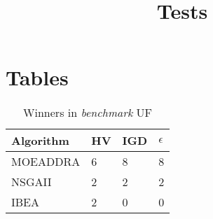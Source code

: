 \documentclass{article}
\title{Tests}
\begin{document}
\maketitle

\section{Tables}

\begin{table}[!h]
\caption{Winners in \emph{benchmark} UF}
\label{Table:Table:winners.UF}
\centering
\begin{scriptsize}
\begin{tabular}{llll}
Algorithm & HV & IGD & $\epsilon$\\
\hline 
MOEADDRA & \cellcolor{gray95}6 & \cellcolor{gray95}8 &  \cellcolor{gray95} 8 \\
NSGAII & 2 & 2 & 2\\
IBEA & 2 & 0 & 0\\
\hline
\end{tabular}
\end{scriptsize}
\end{table}
\end{document}
